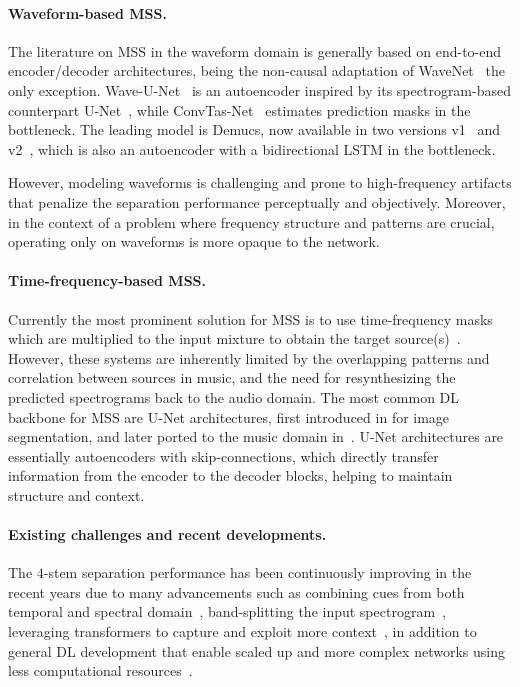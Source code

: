 \paragraph*{Waveform-based \acrshort{MSS}.} The literature on \acrshort{MSS} in the waveform domain is generally based on end-to-end encoder/decoder architectures, being the non-causal adaptation of WaveNet~\citep{vandenoord-wavenet,rethage-wavenet_denoising} the only exception. Wave-U-Net~\citep{stoller-waveunet} is an autoencoder inspired by its spectrogram-based counterpart U-Net~\citep{jansson-unet}, while ConvTas-Net~\citep{defossez-demucs_waveform,luo-conv_tasnet} estimates prediction masks in the bottleneck. The leading model is Demucs, now available in two versions v1~\citep{defossez-demucs} and v2~\citep{defossez-demucs_waveform}, which is also an autoencoder with a bidirectional LSTM in the bottleneck. 

However, modeling waveforms is challenging and prone to high-frequency artifacts that penalize the separation performance perceptually and objectively. Moreover, in the context of a problem where frequency structure and patterns are crucial, operating only on waveforms is more opaque to the network. 


\paragraph*{Time-frequency-based \acrshort{MSS}.} Currently the most prominent solution for \acrshort{MSS} is to use time-frequency masks which are multiplied to the input mixture to obtain the target source(s)~\citep{jansson-unet,luo-bsrnn,lu-separation_roformer}. However, these systems are inherently limited by the overlapping patterns and correlation between sources in music, and the need for resynthesizing the predicted spectrograms back to the audio domain.
%
The most common \acrshort{DL} backbone for \acrshort{MSS} are U-Net architectures, first introduced in \citep{ronneberger-unet} for image segmentation, and later ported to the music domain in~\citep{jansson-unet}. U-Net architectures are essentially autoencoders with skip-connections, which directly transfer information from the encoder to the decoder blocks, helping to maintain structure and context.


\paragraph*{Existing challenges and recent developments.} The $4$-stem separation performance has been continuously improving in the recent years due to many advancements such as
%
combining cues from both temporal and spectral domain~\citep{defossez-demucs_hybrid,yu-danna},
%
band-splitting the input spectrogram~\citep{luo-bsrnn,lu-separation_roformer},
%
leveraging transformers to capture and exploit more context~\citep{rouard-transformer_demucs,lu-separation_roformer}, in addition to general \acrshort{DL} development that enable scaled up and more complex networks using less computational resources~\citep{defossez-quantizing}.


